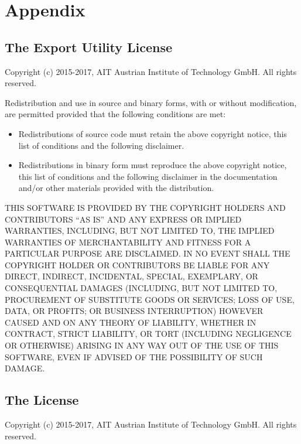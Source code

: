 \chapter{Appendix}

\section{The \fmipp \trnsys Export Utility License}
\label{trnsys_fmu_license}

Copyright (c) 2015-2017, AIT Austrian Institute of Technology GmbH. All
rights reserved.

Redistribution and use in source and binary forms, with or without
modification, are permitted provided that the following conditions are
met:

\begin{itemize}
\itemsep1pt\parskip0pt
\item
  Redistributions of source code must retain the above copyright notice,
  this list of conditions and the following disclaimer.
\item
  Redistributions in binary form must reproduce the above copyright
  notice, this list of conditions and the following disclaimer in the
  documentation and/or other materials provided with the distribution.
\end{itemize}

THIS SOFTWARE IS PROVIDED BY THE COPYRIGHT HOLDERS AND CONTRIBUTORS ``AS
IS'' AND ANY EXPRESS OR IMPLIED WARRANTIES, INCLUDING, BUT NOT LIMITED
TO, THE IMPLIED WARRANTIES OF MERCHANTABILITY AND FITNESS FOR A
PARTICULAR PURPOSE ARE DISCLAIMED. IN NO EVENT SHALL THE COPYRIGHT
HOLDER OR CONTRIBUTORS BE LIABLE FOR ANY DIRECT, INDIRECT, INCIDENTAL,
SPECIAL, EXEMPLARY, OR CONSEQUENTIAL DAMAGES (INCLUDING, BUT NOT LIMITED
TO, PROCUREMENT OF SUBSTITUTE GOODS OR SERVICES; LOSS OF USE, DATA, OR
PROFITS; OR BUSINESS INTERRUPTION) HOWEVER CAUSED AND ON ANY THEORY OF
LIABILITY, WHETHER IN CONTRACT, STRICT LIABILITY, OR TORT (INCLUDING
NEGLIGENCE OR OTHERWISE) ARISING IN ANY WAY OUT OF THE USE OF THIS
SOFTWARE, EVEN IF ADVISED OF THE POSSIBILITY OF SUCH DAMAGE.


\section{The \fmipp License}
\label{fmipp_license}

Copyright (c) 2015-2017, AIT Austrian Institute of Technology GmbH. All
rights reserved.


